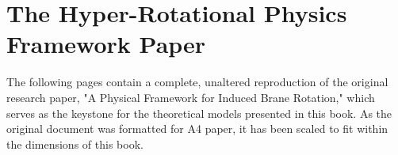 \documentclass[11pt,twoside,openany]{book}
\begin{document}
\chapter{The Hyper-Rotational Physics Framework Paper}

The following pages contain a complete, unaltered reproduction of the original research paper, "A Physical Framework for Induced Brane Rotation," which serves as the keystone for the theoretical models presented in this book. As the original document was formatted for A4 paper, it has been scaled to fit within the dimensions of this book.

\newpage




\backmatter

\printbibliography[heading=bibintoc,title={Bibliography}]





\end{document}
